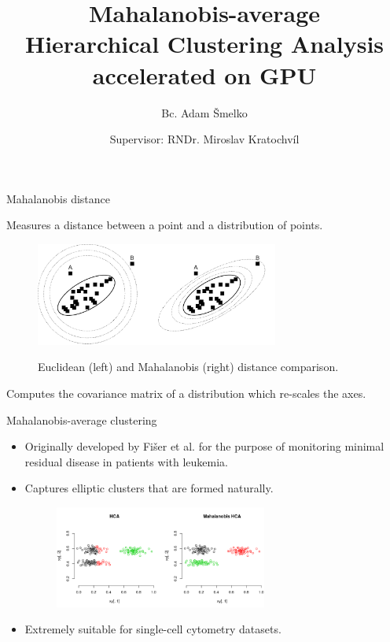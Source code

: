 \documentclass[10pt]{beamer}
\title{Mahalanobis-average \\Hierarchical Clustering Analysis \\accelerated on GPU}
\author{Bc. Adam Šmelko}
\date{Supervisor: RNDr. Miroslav Kratochvíl}
\institute{Department of Software Engineering}
\begin{document}
\maketitle


\begin{frame}{Mahalanobis distance}
	
	Measures a distance between a point and a distribution of points.
	
	\begin{figure}
		\includegraphics[width=8cm]{img/maha_dist}
		
		\small{Euclidean (left) and Mahalanobis (right) distance comparison.}
	\end{figure}

	Computes the covariance matrix of a distribution which re-scales the axes.
		
\end{frame}


\begin{frame}{Mahalanobis-average clustering}
	
	\begin{itemize}
		\item Originally developed by Fišer et al. for the purpose of monitoring
	minimal residual disease in patients with leukemia.
	\item Captures elliptic clusters that are formed naturally.
	
	\begin{figure}
		\includegraphics[width=7cm]{img/mhca}
	\end{figure}
	\item Extremely suitable for single-cell cytometry datasets.
	
	\end{itemize}
	
\end{frame}
\end{document}
